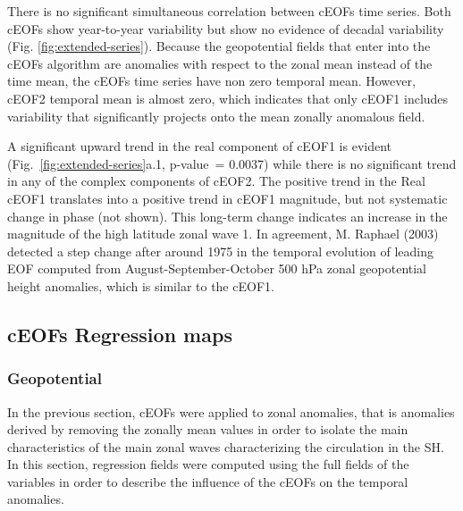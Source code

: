 \documentclass[smallextended]{svjour3}       %
\begin{document}
There is no significant simultaneous correlation between cEOFs time series.
Both cEOFs show year-to-year variability but show no evidence of decadal variability (Fig. \ref{fig:extended-series}).
Because the geopotential fields that enter into the cEOFs algorithm are anomalies with respect to the zonal mean instead of the time mean, the cEOFs time series have non zero temporal mean.
However, cEOF2 temporal mean is almost zero, which indicates that only cEOF1 includes variability that significantly projects onto the mean zonally anomalous field.

A significant upward trend in the real component of cEOF1 is evident (Fig.~\ref{fig:extended-series}a.1, p-value~= 0.0037) while there is no significant trend in any of the complex components of cEOF2.
The positive trend in the Real cEOF1 translates into a positive trend in cEOF1 magnitude, but not systematic change in phase (not shown).
This long-term change indicates an increase in the magnitude of the high latitude zonal wave 1.
In agreement, M. Raphael (2003) detected a step change after around 1975 in the temporal evolution of leading EOF computed from August-September-October 500 hPa zonal geopotential height anomalies, which is similar to the cEOF1.

\hypertarget{regressions}{%
\subsection{cEOFs Regression maps}\label{regressions}}

\hypertarget{geopotential}{%
\subsubsection{Geopotential}\label{geopotential}}

In the previous section, cEOFs were applied to zonal anomalies, that is anomalies derived by removing the zonally mean values in order to isolate the main characteristics of the main zonal waves characterizing the circulation in the SH.
In this section, regression fields were computed using the full fields of the variables in order to describe the influence of the cEOFs on the temporal anomalies.
\end{document}
